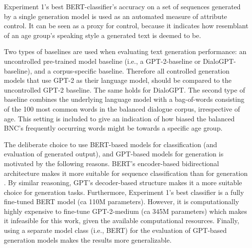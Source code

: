 Experiment 1's best BERT-classifier's accuracy on a set of sequences generated by a single generation model is used as an automated measure of attribute control. It can be seen as a proxy for control, because it indicates how resemblant of an age group's speaking style a generated text is deemed to be.

Two types of baselines are used when evaluating text generation performance: an uncontrolled pre-trained model baseline (i.e., a GPT-2-baseline or DialoGPT-baseline), and a corpus-specific baseline. 
Therefore all controlled generation models that use GPT-2 as their language model, should be compared to the uncontrolled GPT-2 baseline. The same holds for DialoGPT. The second type of baseline combines the underlying language model with a bag-of-words consisting of the 100 most common words in the balanced dialogue corpus, irrespective of age. This setting is included to give an indication of how biased the balanced BNC's frequently occurring words might be towards a specific age group.

The deliberate choice to use BERT-based models for classification (and evaluation of generated output), and GPT-based models for generation is motivated by the following reasons. BERT's encoder-based bidirectional architecture makes it more suitable for sequence classification than for generation \citep{devlin-etal-2019-bert}. By similar reasoning, GPT's decoder-based structure makes it a more suitable choice for generation tasks. Furthermore, Experiment 1's best classifier is a fully fine-tuned BERT model (ca 110M parameters). However, it is computationally highly expensive to fine-tune GPT-2-medium (ca 345M parameters) which makes it infeasible for this work, given the available computational resources. Finally, using a separate model class (i.e., BERT) for the evaluation of GPT-based generation models makes the results more generalizable.





